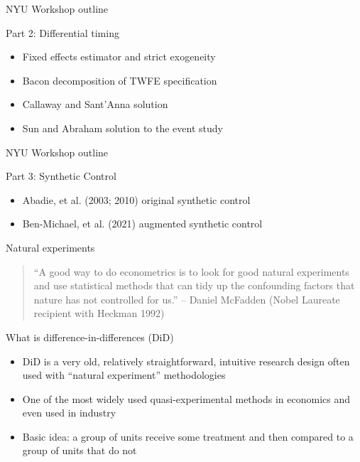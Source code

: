 \documentclass{beamer}
\begin{document}
\begin{frame}{NYU Workshop outline}

Part 2: Differential timing
	\begin{itemize}
	\item Fixed effects estimator and strict exogeneity
	\item Bacon decomposition of TWFE specification 
	\item Callaway and Sant'Anna solution
	\item Sun and Abraham solution to the event study
	\end{itemize}

\end{frame}

\begin{frame}{NYU Workshop outline}

Part 3: Synthetic Control 
	\begin{itemize}
	\item Abadie, et al. (2003; 2010) original synthetic control
	\item Ben-Michael, et al. (2021) augmented synthetic control
	\end{itemize}

\end{frame}




\begin{frame}{Natural experiments}

\begin{quote}
``A good way to do econometrics is to look for good natural experiments and use statistical methods that can tidy up the confounding factors that nature has not controlled for us.'' -- Daniel McFadden (Nobel Laureate recipient with Heckman 1992)
\end{quote}

\end{frame}








\begin{frame}{What is difference-in-differences (DiD)}

\begin{itemize}
\item DiD is a very old, relatively straightforward, intuitive research design often used with ``natural experiment'' methodologies
\item One of the most widely used quasi-experimental methods in economics and even used in industry
\item Basic idea: a group of units receive some treatment and then compared to a group of units that do not
\end{itemize}

\end{frame}
\end{document}
